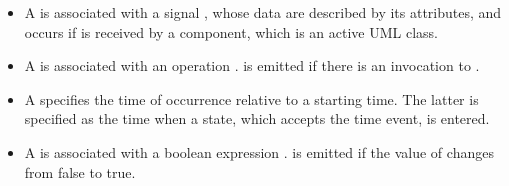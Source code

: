 \begin{itemize}[\footnotesize]
	\itemsep0em
	\item A  is associated with a signal , whose data are described by its attributes, and occurs if  is received by a component, which is an active UML class.
	
	\item A  is associated with an operation . 
	 is emitted if there is an invocation to .
	
	\item A  specifies the time of occurrence  relative to a starting time. 
	The latter is specified as the time when a state, which accepts the time event, is entered.
	
	\item A  is associated with a boolean expression .  is emitted if the value of  changes from false to true.
\end{itemize}

